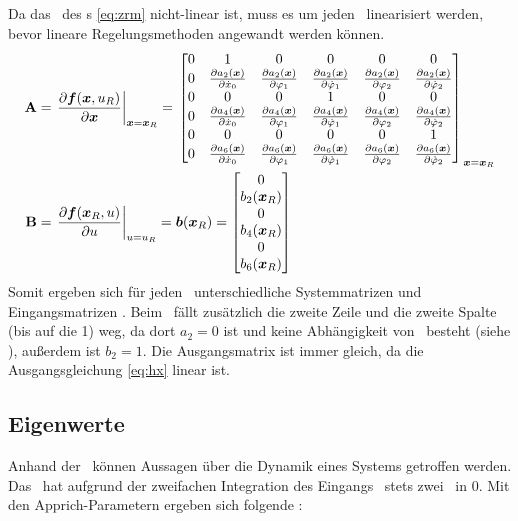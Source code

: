 Da das \zrm\ des \spds s \eqref{eq:zrm} nicht-linear ist, muss es um jeden \ap\ linearisiert werden, bevor lineare Regelungsmethoden angewandt werden können. 
\begin{align}
	{\ensuremath{\boldsymbol{\mathrm{A}}}} &= \left. \frac{\partial \boldsymbol{f}(\boldsymbol{x},u_R)}{\partial \boldsymbol{x}} \right|_{\boldsymbol{x}=\boldsymbol{x}_R}  
		= \left. \begin{bmatrix}
		0 & 1 & 0 & 0 & 0 & 0 \\
		0 & \frac{\partial a_2(\boldsymbol{x})}{\partial \dot{x}_0} & \frac{\partial a_2(\boldsymbol{x})}{\partial \varphi_1} & \frac{\partial a_2(\boldsymbol{x})}{\partial \dot{\varphi}_1} & \frac{\partial a_2(\boldsymbol{x})}{\partial \varphi_2} & \frac{\partial a_2(\boldsymbol{x})}{\partial \dot{\varphi}_2} \\
		0 & 0 & 0 & 1 & 0 & 0 \\
		0 & \frac{\partial a_4(\boldsymbol{x})}{\partial \dot{x}_0} & \frac{\partial a_4(\boldsymbol{x})}{\partial \varphi_1} & \frac{\partial a_4(\boldsymbol{x})}{\partial \dot{\varphi}_1} & \frac{\partial a_4(\boldsymbol{x})}{\partial \varphi_2} & \frac{\partial a_4(\boldsymbol{x})}{\partial \dot{\varphi}_2} \\
		0 & 0 & 0 & 0 & 0 & 1 \\
		0 & \frac{\partial a_6(\boldsymbol{x})}{\partial \dot{x}_0} & \frac{\partial a_6(\boldsymbol{x})}{\partial \varphi_1} & \frac{\partial a_6(\boldsymbol{x})}{\partial \dot{\varphi}_1} & \frac{\partial a_6(\boldsymbol{x})}{\partial \varphi_2} & \frac{\partial a_6(\boldsymbol{x})}{\partial \dot{\varphi}_2} \\
	\end{bmatrix} \right._{\boldsymbol{x}=\boldsymbol{x}_R}  \\
	{\boldsymbol{\mathrm{B}}} &= \left. \frac{\partial \boldsymbol{f}(\boldsymbol{x}_R,u)}{\partial u} \right|_{u=u_R}
	= \boldsymbol{b}(\boldsymbol{x}_R) = \begin{bmatrix}
		0 \\ b_2(\boldsymbol{x}_R) \\ 0 \\  b_4(\boldsymbol{x}_R) \\ 0 \\  b_6(\boldsymbol{x}_R)
	\end{bmatrix}
\end{align}
Somit ergeben sich für jeden \ap\ unterschiedliche Systemmatrizen  und Eingangsmatrizen . Beim \bss\ fällt zusätzlich die zweite Zeile und die zweite Spalte (bis auf die 1) weg, da dort $a_2=0$ ist und keine Abhängigkeit von \xop\ besteht (siehe ), außerdem ist $b_2=1$.
Die Ausgangsmatrix  ist immer gleich, da die Ausgangsgleichung \eqref{eq:hx} linear ist.


\subsection{Eigenwerte}

Anhand der \ewe\ können Aussagen über die Dynamik eines Systems getroffen werden. 
Das \bss\ hat aufgrund der zweifachen Integration des Eingangs \xopp\ stets zwei \ewe\ in 0. 
Mit den Apprich-Parametern ergeben sich folgende \ewe:

